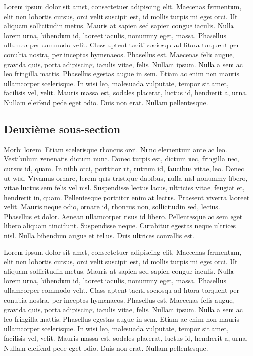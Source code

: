 Lorem ipsum dolor sit amet, consectetuer adipiscing elit. Maecenas fermentum, elit non lobortis cursus, orci velit suscipit est, id mollis turpis mi eget orci. Ut aliquam sollicitudin metus. Mauris at sapien sed sapien congue iaculis. Nulla lorem urna, bibendum id, laoreet iaculis, nonummy eget, massa. Phasellus ullamcorper commodo velit. Class aptent taciti sociosqu ad litora torquent per conubia nostra, per inceptos hymenaeos. Phasellus est. Maecenas felis augue, gravida quis, porta adipiscing, iaculis vitae, felis. Nullam ipsum. Nulla a sem ac leo fringilla mattis. Phasellus egestas augue in sem. Etiam ac enim non mauris ullamcorper scelerisque. In wisi leo, malesuada vulputate, tempor sit amet, facilisis vel, velit. Mauris massa est, sodales placerat, luctus id, hendrerit a, urna. Nullam eleifend pede eget odio. Duis non erat. Nullam pellentesque.


\subsection{Deuxième sous-section}

Morbi lorem. Etiam scelerisque rhoncus orci. Nunc elementum ante ac leo. Vestibulum venenatis dictum nunc. Donec turpis est, dictum nec, fringilla nec, cursus id, quam. In nibh orci, porttitor ut, rutrum id, faucibus vitae, leo. Donec ut wisi. Vivamus ornare, lorem quis tristique dapibus, nulla nisl nonummy libero, vitae luctus sem felis vel nisl. Suspendisse lectus lacus, ultricies vitae, feugiat et, hendrerit in, quam. Pellentesque porttitor enim at lectus. Praesent viverra laoreet velit. Mauris neque odio, ornare id, rhoncus non, sollicitudin sed, lectus. Phasellus et dolor. Aenean ullamcorper risus id libero. Pellentesque ac sem eget libero aliquam tincidunt. Suspendisse neque. Curabitur egestas neque ultrices nisl. Nulla bibendum augue et tellus. Duis ultrices convallis est.

Lorem ipsum dolor sit amet, consectetuer adipiscing elit. Maecenas fermentum, elit non lobortis cursus, orci velit suscipit est, id mollis turpis mi eget orci. Ut aliquam sollicitudin metus. Mauris at sapien sed sapien congue iaculis. Nulla lorem urna, bibendum id, laoreet iaculis, nonummy eget, massa. Phasellus ullamcorper commodo velit. Class aptent taciti sociosqu ad litora torquent per conubia nostra, per inceptos hymenaeos. Phasellus est. Maecenas felis augue, gravida quis, porta adipiscing, iaculis vitae, felis. Nullam ipsum. Nulla a sem ac leo fringilla mattis. Phasellus egestas augue in sem. Etiam ac enim non mauris ullamcorper scelerisque. In wisi leo, malesuada vulputate, tempor sit amet, facilisis vel, velit. Mauris massa est, sodales placerat, luctus id, hendrerit a, urna. Nullam eleifend pede eget odio. Duis non erat. Nullam pellentesque.

